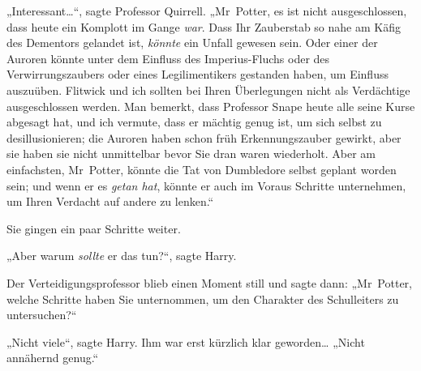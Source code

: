 „Interessant…“, sagte Professor Quirrell. „Mr~Potter, es ist nicht ausgeschlossen, dass heute ein Komplott im Gange \emph{war}. Dass Ihr Zauberstab so nahe am Käfig des Dementors gelandet ist, \emph{könnte} ein Unfall gewesen sein. Oder einer der Auroren könnte unter dem Einfluss des Imperius-Fluchs oder des Verwirrungszaubers oder eines Legilimentikers gestanden haben, um Einfluss auszuüben. Flitwick und ich sollten bei Ihren Überlegungen nicht als Verdächtige ausgeschlossen werden. Man bemerkt, dass Professor Snape heute alle seine Kurse abgesagt hat, und ich vermute, dass er mächtig genug ist, um sich selbst zu desillusionieren; die Auroren haben schon früh Erkennungszauber gewirkt, aber sie haben sie nicht unmittelbar bevor Sie dran waren wiederholt. Aber am einfachsten, Mr~Potter, könnte die Tat von Dumbledore selbst geplant worden sein; und wenn er es \emph{getan hat}, könnte er auch im Voraus Schritte unternehmen, um Ihren Verdacht auf andere zu lenken.“

Sie gingen ein paar Schritte weiter.

„Aber warum \emph{sollte} er das tun?“, sagte Harry.

Der Verteidigungsprofessor blieb einen Moment still und sagte dann: „Mr~Potter, welche Schritte haben Sie unternommen, um den Charakter des Schulleiters zu untersuchen?“

„Nicht viele“, sagte Harry. Ihm war erst kürzlich klar geworden… „Nicht annähernd genug.“

